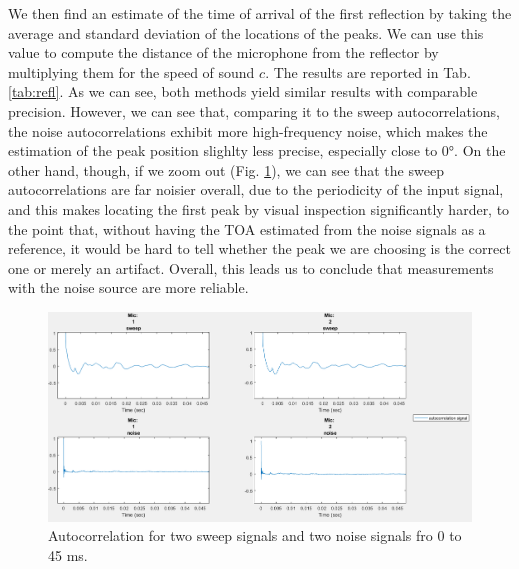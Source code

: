\documentclass[a4paper]{article}
\begin{document}
We then find an estimate of the time of arrival of the first reflection by taking the average and standard deviation of the locations of the peaks.  We can use this value to compute the distance of the microphone from the reflector by multiplying them for the speed of sound $c$. The results are reported in Tab. \ref{tab:refl}. As we can see, both methods yield similar results with comparable precision. However, we can see that, comparing it to the  sweep autocorrelations, the noise autocorrelations exhibit more high-frequency noise, which makes the estimation of the peak position slighlty less precise, especially close to 0°. On the other hand, though, if we zoom out (Fig. \ref{fig:autocorr}), we can see that the sweep autocorrelations are far noisier overall, due to the periodicity of the input signal, and this makes locating the first peak by visual inspection significantly harder, to the point that, without having the TOA estimated from the noise signals as a reference, it would be hard to tell whether the peak we are choosing is the correct one or merely an artifact. Overall, this leads us to conclude that measurements with the noise source are more reliable.




\begin{figure}
	\centering
	\includegraphics[width=0.75\linewidth]{autocorrelation.png}
	\caption{Autocorrelation for two sweep signals and two noise signals fro 0 to 45 ms.}
	\label{fig:autocorr}
\end{figure}
\end{document}
